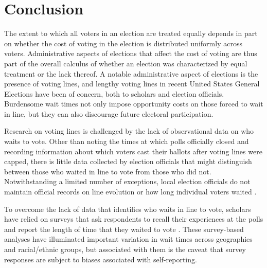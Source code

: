 \documentclass[12pt,titlepage]{article}
\begin{document}
\section*{Conclusion}

The extent to which all voters in an election are treated equally
depends in part on whether the cost of voting in the election is
distributed uniformly across voters. Administrative aspects of
elections that affect the cost of voting are thus part of the overall
calculus of whether an election was characterized by equal treatment
or the lack thereof.  A notable administrative aspect of elections is
the presence of voting lines, and lengthy voting lines in recent
United States General Elections have been of concern, both to scholars
and election officials.  Burdensome wait times not only impose
opportunity costs on those forced to wait in line, but they can also
discourage future electoral participation.

Research on voting lines is challenged by the lack of observational
data on who waits to vote.  Other than noting the times at which polls
officially closed and recording information about which voters cast
their ballots after voting lines were capped, there is little data
collected by election officials that might distinguish between those
who waited in line to vote from those who did not.  Notwithstanding a
limited number of exceptions, local election officials do not maintain
official records on line evolution or how long individual voters
waited \citep{herron:confidence}.


To overcome the lack of data that identifies who waits in line to
vote, scholars have relied on surveys that ask respondents to recall
their experiences at the polls and report the length of time that they
waited to vote \citep{stewart:waitingtovote2012,
  pettigrew:racegapwaittimes}.  These survey-based analyses have
illuminated important variation in wait times across geographies and
racial/ethnic groups, but associated with them is the caveat that
survey responses are subject to biases associated with self-reporting.
\end{document}

